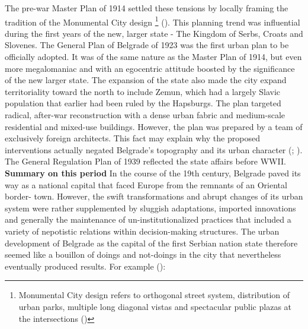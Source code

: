 \documentclass[11pt]{report}
\begin{document}
The pre-war Master Plan of 1914 settled these tensions by locally framing the tradition of the Monumental City design 
\footnote{Monumental City design refers to orthogonal street system, distribution of urban parks, multiple long diagonal vistas and spectacular public plazas at the intersections (\href{Hirt}{\citealt{hirt_belgrade_2009}})}
(\href{Perovic}{\citealt{perovic_iskustva_2008}}).
This planning trend was influential during the first years of the new, larger state - The Kingdom of Serbs, Croats and Slovenes. The General Plan of Belgrade of 1923 was the first urban plan to be officially adopted. It was of the same nature as the Master Plan of 1914, but even more megalomaniac and with an egocentric attitude boosted by the significance of the new larger state.  The expansion of the state also made the city expand territoriality toward the north to include Zemun, which had a largely Slavic population that earlier had been ruled by the Hapsburgs. The plan targeted radical, after-war reconstruction with a dense urban fabric and medium-scale residential and mixed-use buildings. However, the plan was prepared by a team of exclusively foreign architects. This fact may explain why the proposed interventions actually negated Belgrade’s topography and its urban character  (\href{Grozdanic}{\citealt{grozdanic_belgrade_2008}}; \href{Blagojevic}{\citealt{blagojevic_urban_2009}}).
The General Regulation Plan of 1939 reflected the state affairs before WWII.
\\

\textbf{Summary on this period}
In the course of the 19th century, Belgrade paved its way as a national capital that faced Europe from the remnants of an Oriental border- town. However, the swift transformations and abrupt changes of its urban system were rather supplemented by sluggish adaptations, imported innovations and generally the maintenance of un-institutionalized practices that included a variety of nepotistic relations within decision-making structures. The urban development of Belgrade as the capital of the first Serbian nation state therefore seemed like a bouillon of doings and not-doings in the city that nevertheless eventually produced results. For example (\href{Dubravka}{\citealt{stojanovic_kontroverze_2015}}):
\end{document}
